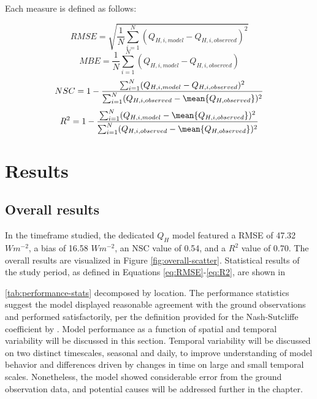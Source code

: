 Each measure is defined as follows:

\begin{equation} \label{eq:RMSE}
    RMSE = \sqrt{\frac{1}{N} \sum_{i=1}^{N}(Q_{H, i, model} - Q_{H, i, observed})^2}
\end{equation}
\begin{equation} \label{eq:MBE}
    MBE = \frac{1}{N} \sum_{i=1}^{N} (Q_{H, i, model} - Q_{H, i, observed})
\end{equation}
\begin{equation} \label{eq:NSC}
    NSC = 1 - \frac{\sum_{i=1}^{N} (Q_{H, i, model} - Q_{H, i, observed})^2}{\sum_{i=1}^{N}(Q_{H, i, observed} - \mean{Q_{H, observed}})^2}
\end{equation} 
\begin{equation} \label{eq:R2}
    R^2 = 1 - \frac{\sum_{i=1}^{N}(Q_{H, i, model} - \mean{Q_{H, i, observed}})^2}{\sum_{i=1}^{N}(Q_{H, i, observed} - \mean{Q_{H, observed}})^2}
\end{equation}

\section{Results}

\subsection{Overall results}
In the timeframe studied, the dedicated $Q_H$ model featured a RMSE of 47.32 $W m^{-2}$, a bias of 16.58 $W m^{-2}$, an NSC value of 0.54, and a $R^2$ value of 0.70. The overall results are visualized in Figure \ref{fig:overall-scatter}. Statistical results of the study period, as defined in Equations \ref{eq:RMSE}-\ref{eq:R2}, are shown in 

 \ref{tab:performance-stats} decomposed by location. The performance statistics suggest the model displayed reasonable agreement with the ground observations and performed satisfactorily, per the definition provided for the Nash-Sutcliffe coefficient by \citet{Moriasi_2007}.  Model performance as a function of spatial and temporal variability will be discussed in this section. Temporal variability will be discussed on two distinct timescales, seasonal and daily, to improve understanding of model behavior and differences driven by changes in time on large and small temporal scales.  Nonetheless, the model showed considerable error from the ground observation data, and potential causes will be addressed further in the chapter. 


